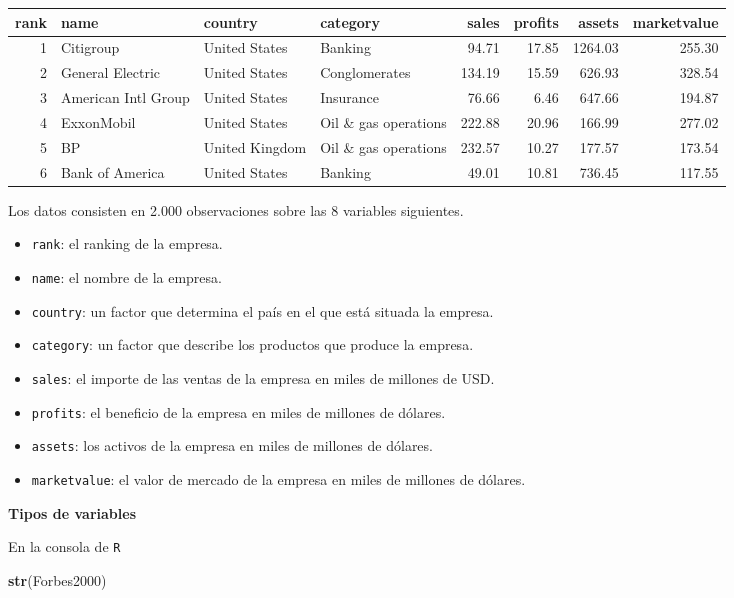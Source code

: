 \documentclass[]{book}
\newenvironment{Shaded}{\begin{snugshade}}{\end{snugshade}}
\newcommand{\KeywordTok}[1]{\textcolor[rgb]{0.13,0.29,0.53}{\textbf{#1}}}
\newcommand{\NormalTok}[1]{#1}
\providecommand{\tightlist}{%
  \setlength{\itemsep}{0pt}\setlength{\parskip}{0pt}}
\begin{document}
\begin{tabular}{r|l|l|l|r|r|r|r}
\hline
rank & name & country & category & sales & profits & assets & marketvalue\\
\hline
1 & Citigroup & United States & Banking & 94.71 & 17.85 & 1264.03 & 255.30\\
\hline
2 & General Electric & United States & Conglomerates & 134.19 & 15.59 & 626.93 & 328.54\\
\hline
3 & American Intl Group & United States & Insurance & 76.66 & 6.46 & 647.66 & 194.87\\
\hline
4 & ExxonMobil & United States & Oil \& gas operations & 222.88 & 20.96 & 166.99 & 277.02\\
\hline
5 & BP & United Kingdom & Oil \& gas operations & 232.57 & 10.27 & 177.57 & 173.54\\
\hline
6 & Bank of America & United States & Banking & 49.01 & 10.81 & 736.45 & 117.55\\
\hline
\end{tabular}

Los datos consisten en 2.000 observaciones sobre las 8 variables
siguientes.

\begin{itemize}
\tightlist
\item
  \texttt{rank}: el ranking de la empresa.
\item
  \texttt{name}: el nombre de la empresa.
\item
  \texttt{country}: un factor que determina el país en el que está
  situada la empresa.
\item
  \texttt{category}: un factor que describe los productos que produce la
  empresa.
\item
  \texttt{sales}: el importe de las ventas de la empresa en miles de
  millones de USD.
\item
  \texttt{profits}: el beneficio de la empresa en miles de millones de
  dólares.
\item
  \texttt{assets}: los activos de la empresa en miles de millones de
  dólares.
\item
  \texttt{marketvalue}: el valor de mercado de la empresa en miles de
  millones de dólares.
\end{itemize}

\textbf{Tipos de variables}

En la consola de \texttt{R}

\begin{Shaded}
\begin{Highlighting}[]
\KeywordTok{str}\NormalTok{(Forbes2000)}
\end{Highlighting}
\end{Shaded}
\end{document}
